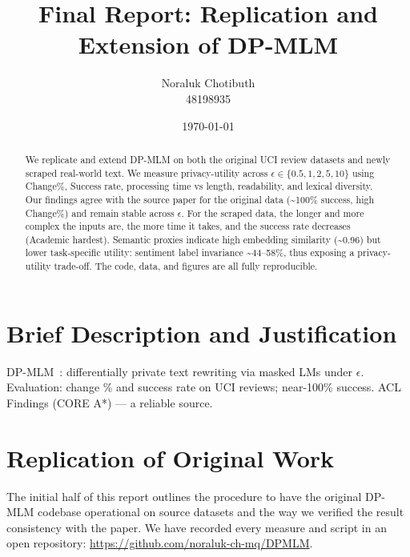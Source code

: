 \documentclass[11pt]{article}
\title{Final Report: Replication and Extension of DP-MLM}
\author{Noraluk Chotibuth\\48198935}
\date{\today}
\begin{document}
\pagestyle{fancy}
\fancyhf{}
\rhead{\thepage}
\renewcommand{\headrulewidth}{0.4pt}
\setlength{\headheight}{13.6pt}
\addtolength{\topmargin}{-1.6pt}
\setlength{\emergencystretch}{3em}
\maketitle

\begin{abstract}
We replicate and extend DP-MLM on both the original UCI review datasets and newly scraped real-world text. We measure privacy-utility across $\epsilon\in\{0.5,1,2,5,10\}$ using Change\%, Success rate, processing time vs length, readability, and lexical diversity. Our findings agree with the source paper for the original data (\textasciitilde100\% success, high Change\%) and remain stable across $\epsilon$. For the scraped data, the longer and more complex the inputs are, the more time it takes, and the success rate decreases (Academic hardest). Semantic proxies indicate high embedding similarity (\textasciitilde0.96) but lower task-specific utility: sentiment label invariance \textasciitilde44–58\%, thus exposing a privacy-utility trade-off. The code, data, and figures are all fully reproducible.
\end{abstract}

\section{Brief Description and Justification}
DP-MLM~\cite{dpmlm}: differentially private text rewriting via masked LMs under $\epsilon$.
Evaluation: change \% and success rate on UCI reviews; near-100\% success. ACL Findings (CORE A*) — a reliable source.

\section{Replication of Original Work}
The initial half of this report outlines the procedure to have the original DP-MLM codebase operational on source datasets and the way we verified the result consistency with the paper. We have recorded every measure and script in an open repository: \url{https://github.com/noraluk-ch-mq/DPMLM}.
\end{document}
